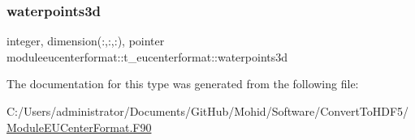 \subsubsection{\texorpdfstring{waterpoints3d}{waterpoints3d}}
{\footnotesize\ttfamily integer, dimension(\+:,\+:,\+:), pointer moduleeucenterformat\+::t\+\_\+eucenterformat\+::waterpoints3d\hspace{0.3cm}{\ttfamily [private]}}



The documentation for this type was generated from the following file\+:\begin{DoxyCompactItemize}
\item 
C\+:/\+Users/administrator/\+Documents/\+Git\+Hub/\+Mohid/\+Software/\+Convert\+To\+H\+D\+F5/\mbox{\hyperlink{_module_e_u_center_format_8_f90}{Module\+E\+U\+Center\+Format.\+F90}}\end{DoxyCompactItemize}
